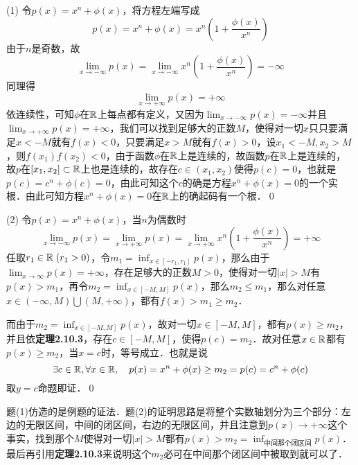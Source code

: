 (1) \prove 令$p(x)=x^n + \phi (x)$，将方程左端写成
\begin{equation}
    p(x) = x^n + \phi(x) = x^n (1 + \frac{\phi(x)}{x^n})
\end{equation}
由于$n$是奇数，故
\begin{equation}
    \lim_{x \to -\infty} p(x) = \lim_{x \to -\infty} x^n(1+\frac{\phi(x)}{x^n}) = -\infty
\end{equation}
同理得
\begin{equation}
    \lim_{x \to +\infty} p(x) = +\infty
\end{equation}
依连续性，可知$\phi$在$\mathbb{R}$上每点都有定义，又因为$\displaystyle\lim_{x \to -\infty} p(x) = -\infty$并且$\displaystyle\lim_{x \to +\infty} p(x) = +\infty$，我们可以找到足够大的正数$M$，使得对一切$x$只只要满足$x < -M$就有$f(x) < 0$，只要满足$x > M$就有$f(x) > 0$，设$x_1 < -M, x_2 > M$，则$f(x_1)f(x_2) < 0$，由于函数$\phi$在$\mathbb{R}$上是连续的，故函数$p$在$\mathbb{R}$上是连续的，故$p$在$[x_1, x_2] \subset \mathbb{R}$上也是连续的，故存在$c \in (x_1, x_2)$使得$p(c) = 0$，也就是$p(c) = c^n + \phi(c) = 0$，由此可知这个$c$的确是方程$x^n+\phi(x)=0$的一个实根．由此可知方程$x^n+\phi(x)=0$在$\mathbb{R}$上的确起码有一个根．\qed\bigskip

(2) \prove 令$p(x) = x^n + \phi(x)$，当$n$为偶数时
\begin{equation}
    \lim_{x \to -\infty} p(x) = \lim_{x \to +\infty} p(x) = \lim_{x \to +\infty} x^n(1+\frac{\phi(x)}{x^n}) = +\infty
\end{equation}
任取$r_1 \in \mathbb{R} \; (r_1 > 0)$，令$m_1 = \displaystyle\inf_{x \in [-r_1, r_1]} p(x)$，那么由于$\displaystyle\lim_{x \to \infty} p(x) = +\infty$，存在足够大的正数$M > 0$，使得对一切$\lvert x \rvert > M$有$p(x) > m_1$，再令$m_2 = \displaystyle\inf_{x \in [-M, M]} p(x)$，那么$m_2 \leq m_1$，那么对任意$x \in (-\infty, M) \bigcup (M, +\infty)$，都有$f(x) > m_1 \geq m_2$．

而由于$m_2 = \displaystyle\inf_{x \in [-M,M]} p(x)$，故对一切$x \in [-M, M]$，都有$p(x) \geq m_2$，并且依\textbf{定理2.10.3}，存在$c \in [-M, M]$，使得$p(c) = m_2$．故对任意$x \in \mathbb{R}$都有$p(x) \geq m_2$，当$x = c$时，等号成立．也就是说
\begin{equation}
    \exists c \in \mathbb{R}, \forall x \in \mathbb{R}, \quad p(x) = x^n + \phi(x) \geq m_2 = p(c) = c^n + \phi(c) 
\end{equation}
取$y=c$命题即证．\qed\bigskip

\annotate 题(1)仿造的是例题的证法．题(2)的证明思路是将整个实数轴划分为三个部分：左边的无限区间，中间的闭区间，右边的无限区间，并且注意到$p(x) \to +\infty$这个事实，找到那个$M$使得对一切$\lvert x \rvert > M$都有$p(x) > m_2= \displaystyle\inf_{\text{中间那个闭区间}} p(x)$．最后再引用\textbf{定理2.10.3}来说明这个$m_2$必可在中间那个闭区间中被取到就可以了．